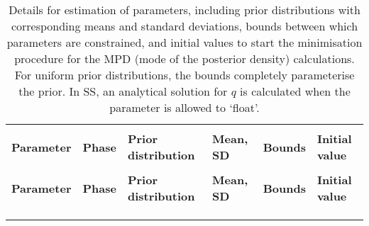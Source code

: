 \documentclass[11pt]{book}
\def\bfTh{{\bf \Theta}}%
\newcommand{\comment}[1]{}                    %
\def\bfTh{{\bf \Theta}}          %
\newcommand{\eref}[1]{(\ref{#1})}
\begin{document}

\begin{longtable}{L{1in}C{1.0in}C{1.0in}C{1.0in}C{1.0in}C{1.4in}}
\caption{Details for estimation of parameters, including prior distributions with corresponding means and standard deviations, bounds between which parameters are constrained, and initial values to start the minimisation procedure for the MPD (mode of the posterior density) calculations. For uniform prior distributions, the bounds completely parameterise the prior. In SS, an analytical solution for $q$ is calculated when the parameter is allowed to `float'.}
\comment{
}
\label{tab:priors}
\\ \hline\\[-2.2ex]
\textbf{Parameter} & \textbf{Phase} & \textbf{Prior distribution} & \textbf{Mean, SD} & \textbf{Bounds} & \textbf{Initial value}
\\[0.2ex]\hline\\[-1.5ex] \endfirsthead \hline 
\textbf{Parameter} & \textbf{Phase} & \textbf{Prior distribution} & \textbf{Mean, SD} & \textbf{Bounds} & \textbf{Initial value}
\\[0.2ex]\hline\\[-1.5ex] \endhead
\hline\\[-2.2ex]   \endfoot  \hline \endlastfoot  %


\end{longtable}
\end{document}
